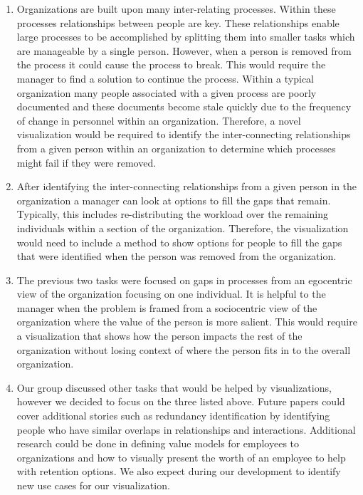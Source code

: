 \documentclass{soups}
\begin{document}
\begin{enumerate}
\item Organizations are built upon many inter-relating processes.  Within these processes relationships between people are key.  These relationships enable large processes to be accomplished by splitting them into smaller tasks which are manageable by a single person.  However, when a person is removed from the process it could cause the process to break.  This would require the manager to find a solution to continue the process.  Within a typical organization many people associated with a given process are poorly documented and these documents become stale quickly due to the frequency of change in personnel within an organization.  Therefore, a novel visualization would be required to identify the inter-connecting relationships from a given person within an organization to determine which processes might fail if they were removed.
\item After identifying the inter-connecting relationships from a given person in the organization a manager can look at options to fill the gaps that remain.  Typically, this includes re-distributing the workload over the remaining individuals within a section of the organization.  Therefore, the visualization would need to include a method to show options for people to fill the gaps that were identified when the person was removed from the organization.
\item The previous two tasks were focused on gaps in processes from an egocentric view of the organization focusing on one individual.  It is helpful to the manager when the problem is framed from a sociocentric view of the organization where the value of the person is more salient.  This would require a visualization that shows how the person impacts the rest of the organization without losing context of where the person fits in to the overall organization.
\item Our group discussed other tasks that would be helped by visualizations, however we decided to focus on the three listed above.  Future papers could cover additional stories such as redundancy identification by identifying people who have similar overlaps in relationships and interactions.  Additional research could be done in defining value models for employees to organizations and how to visually present the worth of an employee to help with retention options.  We also expect during our development to identify new use cases for our visualization.  
\end{enumerate}
\end{document}
